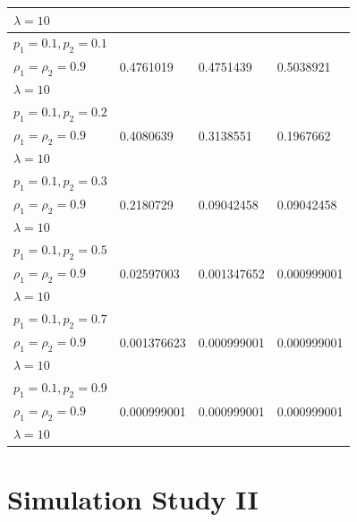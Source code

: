 \documentclass[12pt,oneside]{report}
\theoremstyle{definition}
\theoremstyle{mystyle}
\begin{document}
\begin{landscape}
\begin{center}
\begin{longtable}[h!]{|l|l|l| l|}
			$\lambda=10$ &  & & \\ \hline
			$ p_{1}=0.1,p_{2}=0.1$ &  & & \\
			$ \rho_{1}=\rho_{2}=0.9 $  & 0.4761019 &0.4751439 &0.5038921\\
			$\lambda=10$ &  &  &\\ \hline
			$ p_{1}=0.1,p_{2}=0.2$ &  &  & \\ 
			$ \rho_{1}=\rho_{2}=0.9 $  &0.4080639  & 0.3138551 & 0.1967662\\
			$\lambda=10$ &  &  &\\ \hline
			$ p_{1}=0.1,p_{2}=0.3$&   & & \\
			$ \rho_{1}=\rho_{2}=0.9 $  &0.2180729  & 0.09042458 & 0.09042458\\
			$\lambda=10$ &  &  &\\ \hline
			$ p_{1}=0.1,p_{2}=0.5$ &  && \\
			$ \rho_{1}=\rho_{2}=0.9 $  & 0.02597003  &0.001347652  &0.000999001  \\
			$\lambda=10$ &  & & \\ \hline
			$ p_{1}=0.1,p_{2}=0.7$ & & & \\
			$ \rho_{1}=\rho_{2}=0.9 $  & 0.001376623  &0.000999001  &0.000999001\\
			$\lambda=10$ &  &  &\\ \hline
			$ p_{1}=0.1,p_{2}=0.9$ & & & \\
			$ \rho_{1}=\rho_{2}=0.9 $ &0.000999001  &0.000999001   &0.000999001 \\
			$\lambda=10$ &  & & \\ \hline
			
		\end{longtable}
	\end{center}
\end{landscape}
\newpage
\section{Simulation Study II}
\end{document}

